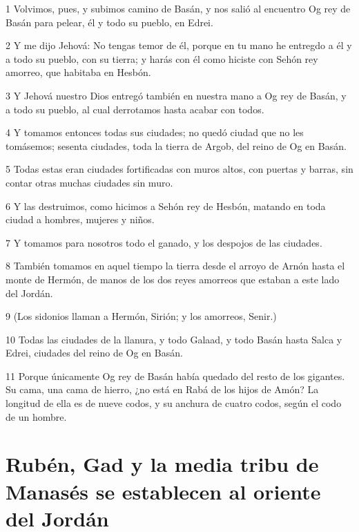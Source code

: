\par 1 Volvimos, pues, y subimos camino de Basán, y nos salió al encuentro Og rey de Basán para pelear, él y todo su pueblo, en Edrei.
\par 2 Y me dijo Jehová: No tengas temor de él, porque en tu mano he entregdo a él y a todo su pueblo, con su tierra; y harás con él como hiciste con Sehón rey amorreo, que habitaba en Hesbón.
\par 3 Y Jehová nuestro Dios entregó también en nuestra mano a Og rey de Basán, y a todo su pueblo, al cual derrotamos hasta acabar con todos.
\par 4 Y tomamos entonces todas sus ciudades; no quedó ciudad que no les tomásemos; sesenta ciudades, toda la tierra de Argob, del reino de Og en Basán.
\par 5 Todas estas eran ciudades fortificadas con muros altos, con puertas y barras, sin contar otras muchas ciudades sin muro.
\par 6 Y las destruimos, como hicimos a Sehón rey de Hesbón, matando en toda ciudad a hombres, mujeres y niños.
\par 7 Y tomamos para nosotros todo el ganado, y los despojos de las ciudades.
\par 8 También tomamos en aquel tiempo la tierra desde el arroyo de Arnón hasta el monte de Hermón, de manos de los dos reyes amorreos que estaban a este lado del Jordán.
\par 9 (Los sidonios llaman a Hermón, Sirión; y los amorreos, Senir.)
\par 10 Todas las ciudades de la llanura, y todo Galaad, y todo Basán hasta Salca y Edrei, ciudades del reino de Og en Basán.
\par 11 Porque únicamente Og rey de Basán había quedado del resto de los gigantes. Su cama, una cama de hierro, ¿no está en Rabá de los hijos de Amón? La longitud de ella es de nueve codos,  y su anchura de cuatro codos, según el codo de un hombre.

\section*{Rubén, Gad y la media tribu de Manasés se establecen al oriente del Jordán}

